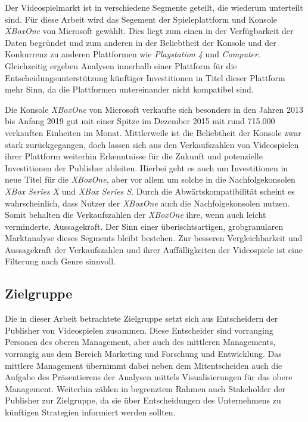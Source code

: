 \documentclass[usegeometry=true]{scrartcl}
\begin{document}
Der Videospielmarkt ist in verschiedene Segmente geteilt, die wiederum unterteilt sind. 
Für diese Arbeit wird das Segement der Spieleplattform und Konsole \textit{XBoxOne} von Microsoft gewählt.
Dies liegt zum einen in der Verfügbarkeit der Daten begründet und zum anderen in der Beliebtheit der Konsole und der Konkurrenz zu anderen Plattformen wie \textit{Playstation 4} und \textit{Computer}.
Gleichzeitig ergeben Analysen innerhalb einer Plattform für die Entscheidungsunterstützung künftiger Investitionen in Titel dieser Plattform mehr Sinn, da die Plattformen untereinander nicht kompatibel sind.

Die Konsole \textit{XBoxOne} von Microsoft verkaufte sich besonders in den Jahren 2013 bis Anfang 2019 gut mit einer Spitze im Dezember 2015 mit rund 715.000 verkauften Einheiten im Monat.
Mittlerweile ist die Beliebtheit der Konsole zwar stark zurückgegangen, doch lassen sich aus den Verkaufszahlen von Videospielen ihrer Plattform weiterhin Erkenntnisse für die Zukunft und potenzielle Investitionen der Publisher ableiten.\cite{Statista.2022}
Hierbei geht es auch um Investitionen in neue Titel für die \textit{XBoxOne}, aber vor allem um solche in die Nachfolgekonsolen \textit{XBox Series X} und \textit{XBox Series S}. 
Durch die Abwärtskompatibilität scheint es wahrscheinlich, dass Nutzer der \textit{XBoxOne} auch die Nachfolgekonsolen nutzen.\cite{GamesWirtschaft.2021} 
Somit behalten die Verkaufszahlen der \textit{XBoxOne} ihre, wenn auch leicht verminderte, Aussagekraft.
Der Sinn einer überischtsartigen, grobgranularen Marktanalyse dieses Segments bleibt bestehen.
Zur besseren Vergleichbarkeit und Aussagekraft der Verkaufszahlen und ihrer Auffälligkeiten der Videospiele ist eine Filterung nach Genre sinnvoll.

\subsection{Zielgruppe}
Die in dieser Arbeit betrachtete Zielgruppe setzt sich aus Entscheidern der Publisher von Videospielen zusammen. 
Diese Entscheider sind vorranging Personen des oberen Management, aber auch des mittleren Managements, vorrangig aus dem Bereich Marketing und Forschung und Entwicklung. 
Das mittlere Management übernimmt dabei neben dem Mitentscheiden auch die Aufgabe des Präsentierens der Analysen mittels Visualisierungen für das obere Management.
Weiterhin zählen in begrenztem Rahmen auch Stakeholder der Publisher zur Zielgruppe, da sie über Entscheidungen des Unternehmens zu künftigen Strategien informiert werden sollten. 
\end{document}

